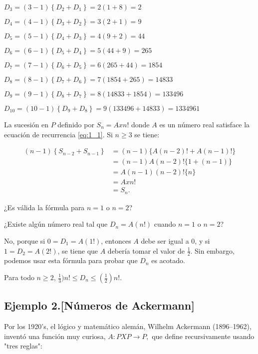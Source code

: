 \begin{example}{}
$D_{3}=\left(3-1\right)\left\{D_{2}+D_{1}\right\}=2\left(1+8\right)=2$

$D_{4}=\left(4 - 1\right)\left\{D_{3}+D_{2}\right\}=3\left(2+1\right)=9$

$D_{5}=\left(5-1\right)\left\{D_{4}+D_{3}\right\}=4\left(9+2\right)=44$

$D_{6}=(6-1)\left\{D_{5}+D_{4}\right\}=5\left(44 + 9\right)=265$

$D_{7}=\left(7-1\right)\left\{D_{6}+D_{5}\right\}=6\left(265+44\right)=1854$

$D_{8}=\left(8-1\right)\left\{D_{7}+D_{6}\right\}=7\left(1854+265\right)=14833$

$D_{9}=\left(9-1\right)\left\{D_{8}+D_{7}\right\}=8\left(14833+1854\right)=133496$

$D_{10}=\left(10-1\right)\left\{D_{9}+D_{8}\right\}=9\left(133496+14833\right)=1334961$

La sucesión en $P$ definido por $S_{n} = Axn!$ donde $A$ es un número real satisface la ecuación de recurrencia \eqref{eq:1_1}. Si $n\geq3$ se tiene:

\begin{align*}
\left(n-1\right)\left\{S_{n-2}+S_{n-1}\right\}
&=(n-1)\{A(n-2)! + A(n-1)!\} \\
&= (n-1)A(n-2)!\{1+(n-1)\} \\
&= A(n-1)(n-2)!\{n\}\\
&= A x n!\\
&= S_{n}.
\end{align*}

¿Es válida la fórmula para $n=1$ o $n=2$?

¿Existe algún número real tal que $D_{n}=A(n!)$ cuando $n=1$ o $n=2$?

No, porque si $0=D_{1}=A(1!)$, entonces $A$ debe ser igual a $0$, y si $1=D_{2}=A(2!)$, se tiene que $A$ debería tomar el valor de $\frac{1}{2}$. Sin embargo, podemos usar esta fórmula para probar que $D_{n}$ es acotado.
\end{example}

\begin{theorem}{}
Para todo $n\geq 2$, $\frac{1}{3})n!\leq D_{n}\leq\left(\frac{1}{2}\right)n!$.
\end{theorem}


\subsection{Ejemplo 2.[Números de Ackermann]}
Por los 1920's, el lógico y matemático alemán, Wilhelm Ackermann (1896–1962), inventó una función muy curiosa, $A\colon PXP\longrightarrow P,$ que define recursivamente usando "tres reglas":

